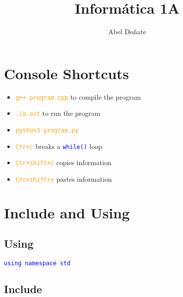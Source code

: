 \documentclass[12pt]{article}
\title{Informática 1A}
\author{Abel Doñate}
\date{}
\newcommand{\code}[1]{\colorbox{light-gray}{\texttt{\textcolor{blue}{#1}}}}
\newcommand{\codeorange}[1]{\colorbox{light-gray}{\texttt{\textcolor{orange}{#1}}}}
\begin{document}
\maketitle
\tableofcontents
\newpage

\section{Console Shortcuts}
\begin{itemize}
	\item \codeorange{g++ program.cpp} to compile the program
	\item \codeorange{./a.out} to run the program
	\item \codeorange{python3 program.py}
	\item \codeorange{Ctr+c} breaks a \code{while()} loop
	\item \codeorange{Ctr+shift+c} copies information
	\item \codeorange{Ctr+shift+v} pastes information
\end{itemize}

\section{Include and Using}
\subsection{Using}
\code{using namespace std}
\subsection{Include}
\end{document}

